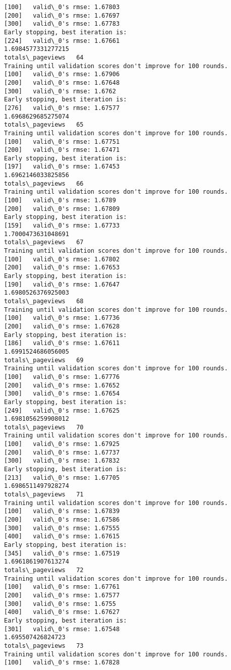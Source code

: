 \documentclass[11pt]{article}
\begin{document}
\begin{Verbatim}[commandchars=\\\{\}]
[100]	valid\_0's rmse: 1.67803
[200]	valid\_0's rmse: 1.67697
[300]	valid\_0's rmse: 1.67783
Early stopping, best iteration is:
[224]	valid\_0's rmse: 1.67661
1.6984577331277215
totals\_pageviews   64
Training until validation scores don't improve for 100 rounds.
[100]	valid\_0's rmse: 1.67906
[200]	valid\_0's rmse: 1.67648
[300]	valid\_0's rmse: 1.6762
Early stopping, best iteration is:
[276]	valid\_0's rmse: 1.67577
1.6968629685275074
totals\_pageviews   65
Training until validation scores don't improve for 100 rounds.
[100]	valid\_0's rmse: 1.67751
[200]	valid\_0's rmse: 1.67471
Early stopping, best iteration is:
[197]	valid\_0's rmse: 1.67453
1.6962146033825856
totals\_pageviews   66
Training until validation scores don't improve for 100 rounds.
[100]	valid\_0's rmse: 1.6789
[200]	valid\_0's rmse: 1.67809
Early stopping, best iteration is:
[159]	valid\_0's rmse: 1.67733
1.7000473631048691
totals\_pageviews   67
Training until validation scores don't improve for 100 rounds.
[100]	valid\_0's rmse: 1.67802
[200]	valid\_0's rmse: 1.67653
Early stopping, best iteration is:
[190]	valid\_0's rmse: 1.67647
1.6980526376925003
totals\_pageviews   68
Training until validation scores don't improve for 100 rounds.
[100]	valid\_0's rmse: 1.67736
[200]	valid\_0's rmse: 1.67628
Early stopping, best iteration is:
[186]	valid\_0's rmse: 1.67611
1.6991524686056005
totals\_pageviews   69
Training until validation scores don't improve for 100 rounds.
[100]	valid\_0's rmse: 1.67776
[200]	valid\_0's rmse: 1.67652
[300]	valid\_0's rmse: 1.67654
Early stopping, best iteration is:
[249]	valid\_0's rmse: 1.67625
1.6981056259908012
totals\_pageviews   70
Training until validation scores don't improve for 100 rounds.
[100]	valid\_0's rmse: 1.67925
[200]	valid\_0's rmse: 1.67737
[300]	valid\_0's rmse: 1.67832
Early stopping, best iteration is:
[213]	valid\_0's rmse: 1.67705
1.6986511497928274
totals\_pageviews   71
Training until validation scores don't improve for 100 rounds.
[100]	valid\_0's rmse: 1.67839
[200]	valid\_0's rmse: 1.67586
[300]	valid\_0's rmse: 1.67555
[400]	valid\_0's rmse: 1.67615
Early stopping, best iteration is:
[345]	valid\_0's rmse: 1.67519
1.6961861907613274
totals\_pageviews   72
Training until validation scores don't improve for 100 rounds.
[100]	valid\_0's rmse: 1.67761
[200]	valid\_0's rmse: 1.67577
[300]	valid\_0's rmse: 1.6755
[400]	valid\_0's rmse: 1.67627
Early stopping, best iteration is:
[301]	valid\_0's rmse: 1.67548
1.695507426824723
totals\_pageviews   73
Training until validation scores don't improve for 100 rounds.
[100]	valid\_0's rmse: 1.67828

\end{Verbatim}
\end{document}
